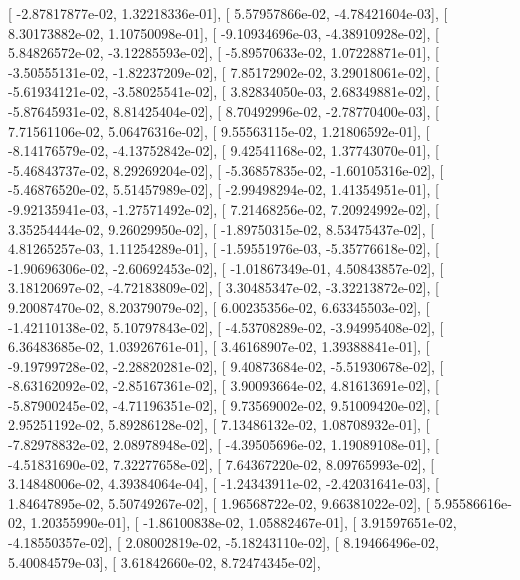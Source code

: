 \documentclass{article}
\begin{document}
       [ -2.87817877e-02,   1.32218336e-01],
       [  5.57957866e-02,  -4.78421604e-03],
       [  8.30173882e-02,   1.10750098e-01],
       [ -9.10934696e-03,  -4.38910928e-02],
       [  5.84826572e-02,  -3.12285593e-02],
       [ -5.89570633e-02,   1.07228871e-01],
       [ -3.50555131e-02,  -1.82237209e-02],
       [  7.85172902e-02,   3.29018061e-02],
       [ -5.61934121e-02,  -3.58025541e-02],
       [  3.82834050e-03,   2.68349881e-02],
       [ -5.87645931e-02,   8.81425404e-02],
       [  8.70492996e-02,  -2.78770400e-03],
       [  7.71561106e-02,   5.06476316e-02],
       [  9.55563115e-02,   1.21806592e-01],
       [ -8.14176579e-02,  -4.13752842e-02],
       [  9.42541168e-02,   1.37743070e-01],
       [ -5.46843737e-02,   8.29269204e-02],
       [ -5.36857835e-02,  -1.60105316e-02],
       [ -5.46876520e-02,   5.51457989e-02],
       [ -2.99498294e-02,   1.41354951e-01],
       [ -9.92135941e-03,  -1.27571492e-02],
       [  7.21468256e-02,   7.20924992e-02],
       [  3.35254444e-02,   9.26029950e-02],
       [ -1.89750315e-02,   8.53475437e-02],
       [  4.81265257e-03,   1.11254289e-01],
       [ -1.59551976e-03,  -5.35776618e-02],
       [ -1.90696306e-02,  -2.60692453e-02],
       [ -1.01867349e-01,   4.50843857e-02],
       [  3.18120697e-02,  -4.72183809e-02],
       [  3.30485347e-02,  -3.32213872e-02],
       [  9.20087470e-02,   8.20379079e-02],
       [  6.00235356e-02,   6.63345503e-02],
       [ -1.42110138e-02,   5.10797843e-02],
       [ -4.53708289e-02,  -3.94995408e-02],
       [  6.36483685e-02,   1.03926761e-01],
       [  3.46168907e-02,   1.39388841e-01],
       [ -9.19799728e-02,  -2.28820281e-02],
       [  9.40873684e-02,  -5.51930678e-02],
       [ -8.63162092e-02,  -2.85167361e-02],
       [  3.90093664e-02,   4.81613691e-02],
       [ -5.87900245e-02,  -4.71196351e-02],
       [  9.73569002e-02,   9.51009420e-02],
       [  2.95251192e-02,   5.89286128e-02],
       [  7.13486132e-02,   1.08708932e-01],
       [ -7.82978832e-02,   2.08978948e-02],
       [ -4.39505696e-02,   1.19089108e-01],
       [ -4.51831690e-02,   7.32277658e-02],
       [  7.64367220e-02,   8.09765993e-02],
       [  3.14848006e-02,   4.39384064e-04],
       [ -1.24343911e-02,  -2.42031641e-03],
       [  1.84647895e-02,   5.50749267e-02],
       [  1.96568722e-02,   9.66381022e-02],
       [  5.95586616e-02,   1.20355990e-01],
       [ -1.86100838e-02,   1.05882467e-01],
       [  3.91597651e-02,  -4.18550357e-02],
       [  2.08002819e-02,  -5.18243110e-02],
       [  8.19466496e-02,   5.40084579e-03],
       [  3.61842660e-02,   8.72474345e-02],
\end{document}

